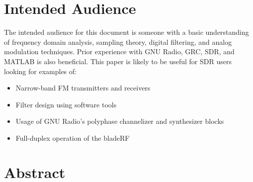 \def \revisions {
  \begin{table}[h]
    \centering
    \begin{tabular}{|c|c|l|}
      \hline
      \tablerowcolor
      \textbf{Revision} & \textbf{Date} & \textbf{Summary} \hspace{4in}  \\ \hline
      1  & 2015-06-12 & Initial public draft \\ \hline
      2  & 2015-10-25 & Incorporated feedback and revisions from Dr. Juan R. Pimentel \\ \hline
      3  & 2016-01-07 & Fixed incorrect frequency values in Figure \ref{fig:tuning} \\ \hline
    \end{tabular}
  \end{table}
}

\def \enablefiguretableindex{yes}

\def \enableacronymlist{yes}





\whitepapercover
\docinfo

\section{Intended Audience}
The intended audience for this document is someone with a basic understanding
of frequency domain analysis, sampling theory, digital filtering, and analog
modulation techniques. Prior experience with GNU Radio, \ac{GRC}, \ac{SDR}, and
MATLAB is also beneficial. This paper is likely to be useful for SDR users
looking for examples of:
\begin{itemize}
    \item Narrow-band FM transmitters and receivers
    \item Filter design using software tools
    \item Usage of GNU Radio's polyphase channelizer and synthesizer blocks
    \item Full-duplex operation of the bladeRF
\end{itemize}

\vspace{0.25in}

\section{Abstract}

